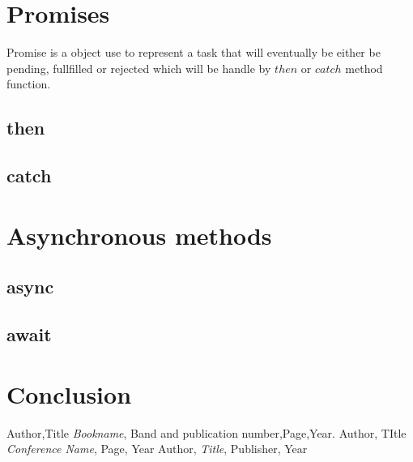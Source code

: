 \documentclass[11pt,a4paper,onecolumn]{IEEEtran}
\begin{document}
\section{Promises}
Promise is a object use to represent a task that will eventually be either be pending, fullfilled or rejected which will be handle by $then$ or $catch$ method function.

\subsection{then}
\subsection{catch}
\section{Asynchronous methods}
\subsection{async}
\subsection{await}

\section{Conclusion}
\lipsum[4-6]
\begin{thebibliography}{9}
   Author,Title \emph{Bookname}, Band and publication number,Page,Year.
   Author, TItle \emph{Conference Name}, Page, Year
   Author, \emph{Title}, Publisher, Year
\end{thebibliography}
\end{document}
